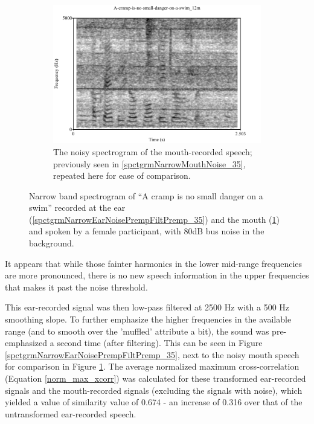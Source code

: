 \begin{figure}[h!]
\begin{subfigure}{\textwidth}
  \DIFaddendFL \centering
  \includegraphics[width=1\linewidth]{figure/spctgrmNarrowMthNoise_35.pdf}
  \caption{The noisy spectrogram of the mouth-recorded speech; previously seen in \ref{spctgrmNarrowMouthNoise_35}, repeated here for ease of comparison.}
  \label{spctgrmNarrowMouthNoise_35_compare}
\end{subfigure}
\caption{Narrow band spectrogram of ``A cramp is no small danger on a swim'' recorded at the ear (\ref{spctgrmNarrowEarNoisePrempFiltPremp_35}) and the mouth (\ref{spctgrmNarrowMouthNoise_35_compare}) and spoken by a female participant, with 80dB bus noise in the background.}
\label{fig:ear_pfp}
\end{figure}
It appears that while those fainter harmonics in the lower mid-range frequencies are more pronounced, there is no new speech information in the upper frequencies that makes it past the noise threshold.

This ear-recorded signal was then low-pass filtered at 2500 Hz with a 500 Hz smoothing slope. To further emphasize the higher frequencies in the available range (and to smooth over the 'muffled' attribute a bit), the sound was pre-emphasized a second time (after filtering).  This can be seen in Figure \ref{spctgrmNarrowEarNoisePrempFiltPremp_35}, next to the noisy mouth speech for comparison in Figure \ref{spctgrmNarrowMouthNoise_35_compare}.  The average normalized maximum cross-correlation (Equation \ref{norm_max_xcorr}) was calculated for these transformed ear-recorded signals and the mouth-recorded signals (excluding the signals with noise), which yielded a value of similarity value of 0.674 - an increase of 0.316 over that of the untransformed ear-recorded speech.

